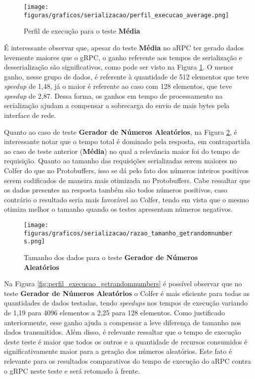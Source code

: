 \begin{figure}[ht]
    \centering
    \caption{Perfil de execução para o teste \textbf{Média}}
    \texttt{[image: figuras/graficos/serializacao/perfil\_execucao\_average.png]} 
    \label{fig:perfil_execucao_average}
\end{figure}

É interessante observar que, apesar do teste \textbf{Média} no aRPC ter gerado dados levemente maiores que o gRPC, o ganho referente aos tempos de serialização e desserialização são significativos, como pode ser visto na Figura \ref{fig:perfil_execucao_average}. O menor ganho, nesse grupo de dados, é referente à quantidade de 512 elementos que teve \textit{speedup} de 1,48, já o maior é referente ao caso com 128 elementos, que teve \textit{speedup} de 2,87. Dessa forma, os ganhos em tempo de processamento na serialização ajudam a compensar a sobrecarga do envio de mais bytes pela interface de rede.


Quanto ao caso de teste \textbf{Gerador de Números Aleatórios}, na Figura \ref{fig:razao_tamanho_getrandomnumbers}, é interessante notar que o tempo total é dominado pela resposta, em contrapartida ao caso de teste anterior (\textbf{Média}) no qual a relevância maior foi do tempo de requisição. Quanto ao tamanho das requisições serializadas serem maiores no Colfer do que no Protobuffers, isso se dá pelo fato dos números inteiros positivos serem codificados de maneira mais otimizada no Protobuffers. Cabe ressaltar que os dados presentes na resposta também são todos números positivos, caso contrário o resultado seria mais favorável ao Colfer, tendo em vista que o mesmo otimiza melhor o tamanho quando os testes apresentam números negativos.

\begin{figure}[ht]
    \centering
    \caption{Tamanho dos dados para o teste \textbf{Gerador de Números Aleatórios}}
    \texttt{[image: figuras/graficos/serializacao/razao\_tamanho\_getrandomnumbers.png]} 
    \label{fig:razao_tamanho_getrandomnumbers}
\end{figure}

Na Figura \ref{fig:perfil_execucao_getrandomnumbers} é possível observar que no teste \textbf{Gerador de Números Aleatórios} o Colfer é mais eficiente para todas as quantidades de dados testadas, tendo \textit{speedups} nos tempos de execução variando de 1,19 para 4096 elementos a 2,25 para 128 elementos. Como justificado anteriormente, esse ganho ajuda a compensar a leve diferença de tamanho nos dados transmitidos. Além disso, é relevante ressaltar que o tempo de execução deste teste é maior que todos os outros e a quantidade de recursos consumidos é significativamente maior para a geração dos números aleatórios. Este fato é relevante para os resultados comparativos do tempo de execução do aRPC contra o gRPC neste teste e será retomado à frente.

